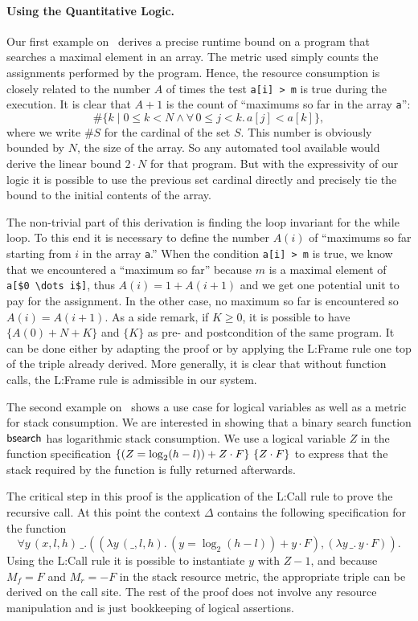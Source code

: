 \documentclass[nocopyrightspace,preprint]{sigplanconf}
\newcommand{\pref}[1]{\prettyref{#1}}
\begin{document}
\paragraph{Using the Quantitative Logic.}

Our first example on~\pref{fig:xmplmax} derives a precise runtime bound
on a program that searches a maximal element in an array.
The metric used simply counts the assignments performed by the program.
Hence, the resource consumption is closely related to the number $A$ of
times the test \lstinline{a[i] > m} is true during the execution.
%
It is clear that $A+1$ is the count of ``maximums so far in the
array \lstinline{a}'':
$$
  \# \{ k \mid 0 \le k < N \land \forall\, 0 \le j < k.\, a[j] < a[k] \},
$$
where we write $\# S$ for the cardinal of the set $S$.  This number is
obviously bounded by $N$, the size of the array.  So any automated tool
available would derive the linear bound $2 \cdot N$ for that program.
But with the expressivity of our logic it is possible to use the
previous set cardinal directly and precisely tie the bound to the
initial contents of the array.

The non-trivial part of this derivation is finding the loop
invariant for the while loop. To this end
it is necessary to define the number $A(i)$ of ``maximums so far
starting from $i$ in the array \lstinline{a}.''  When the condition
\lstinline{a[i] > m} is true, we know that we encountered a ``maximum
so far'' because $m$ is a maximal element of \lstinline{a[$0 \dots i$]},
thus $A(i) = 1 + A(i+1)$ and we get one potential unit to pay for the
assignment.  In the other case, no maximum so far is encountered so
$A(i) = A(i+1)$.  As a side remark, if $K \ge 0$, it is possible to
have $\{ A(0) + N + K \}$ and $\{ K \}$ as pre- and postcondition
of the same program.  It can be done either by adapting the proof or by
applying the {\sc L:Frame} rule one top of the triple already derived.
More generally, it is clear that without function calls, the {\sc L:Frame}
rule is admissible in our system.

The second example on~\pref{fig:xmplbs} shows a use case for
logical variables as well as a metric for stack consumption.
We are interested in showing that a binary search function
$\mathsf{bsearch}$ has logarithmic stack consumption.  We use
a logical variable $Z$ in the function specification
$\{(Z = \log_2(h-l)) + Z \cdot F\}\, \, \{Z \cdot F\}$
to express that the stack required by the function is fully
returned afterwards.

The critical step in this proof is the application of the
{\sc L:Call} rule to prove the recursive call.  At this point
the context $\Delta$ contains the following specification
for the function 
$$
  \forall y \, (x,l,h) \, \_.
  ( (\lambda y \, (\_, l, h) .\, (y {=} \log_2(h {-} l)) + y {\cdot} F)
  , (\lambda y \, \_ .\, y {\cdot} F)
  ).
$$
Using the {\sc L:Call} rule it is possible to instantiate
$y$ with $Z - 1$, and because $M_f = F$ and $M_r = -F$ in
the stack resource metric, the appropriate triple can be
derived on the call site.  The rest of the proof does not
involve any resource manipulation and is just bookkeeping
of logical assertions.
\end{document}
